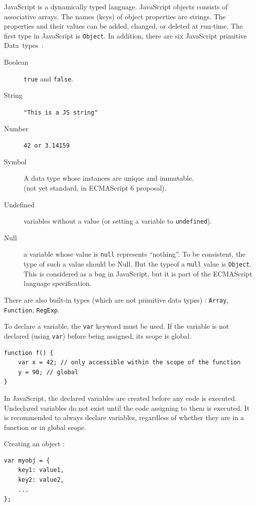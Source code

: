 \documentclass[a4paper,10pt]{article}
\begin{document}
JavaScript is a dynamically typed language.
JavaScript objects consists of associative arrays.
The names (keys) of object properties are strings.
The properties and their values can be added, changed, or deleted at run-time.
The first type in JavaScript is \lstinline[basicstyle=\small\ttfamily]|Object|.
In addition, there are six JavaScript primitive \mbox{Data types :}
\begin{description}
\item[Boolean] \lstinline|true| and \lstinline|false|.

\item[String] \lstinline|"This is a JS string"|

\item[Number] \lstinline|42 or 3.14159|

\item[Symbol] A data type whose instances are unique and immutable. \\
			(not yet standard, in ECMAScript 6 proposal).

\item[Undefined] variables without a value (or setting a variable to \lstinline|undefined|).
\item[Null] a variable whose value is \lstinline|null| represents ``nothing''. To be consistent, the type of such a value should be Null. But the typeof a \lstinline|null| value is \lstinline|Object|. This is considered as a bug in JavaScript, but it is part of the ECMAScript language specification.
\end{description}

There are also built-in types (which are not primitive data types) : \lstinline|Array|, \lstinline|Function|, \lstinline|RegExp|.

To declare a variable, the \lstinline|var| keyword must be used.
If the variable is not declared (using \lstinline|var|) before being assigned, its scope is global.

\begin{lstlisting}
function f() {
	var x = 42; // only accessible within the scope of the function
	y = 90; // global
}
\end{lstlisting}

In JavaScript, the declared variables are created before any code is executed. Undeclared variables do not exist until the code assigning to them is executed.
It is recommended to always declare variables, regardless of whether they are in a function or in global scope.

Creating an object :
\begin{lstlisting}
var myobj = {
	key1: value1,
	key2: value2,
	...
};
\end{lstlisting}
\end{document}
